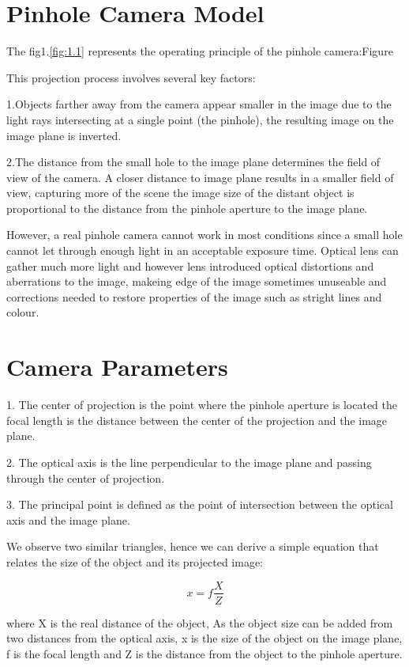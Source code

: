 \documentclass{article}
\begin{document}
\section{Pinhole Camera Model}
The fig1.\ref{fig:1.1} represents the operating principle of the pinhole camera:Figure

This projection process involves several key factors:

1.Objects farther away from the camera appear smaller in the image due to the light rays intersecting at a single point (the pinhole), the resulting image on the image plane is inverted.

2.The distance from the small hole to the image plane determines the field of view of the camera. A closer distance to image plane results in a smaller field of view, capturing more of the scene the image size of the distant object is proportional to the distance from the pinhole aperture to the image plane.

However, a real pinhole camera cannot work in most conditions since a small hole cannot let through enough light in an acceptable exposure time. Optical lens can gather much more light and however lens introduced optical distortions and aberrations to the image, makeing edge of the image sometimes unuseable and corrections needed to restore properties of the image such as stright lines and colour.

\section{Camera Parameters}
1. The center of projection is the point where the pinhole aperture is located the focal length is the distance between the center of the projection and the image plane.

2. The optical axis is the line perpendicular to the image plane and passing through the center of projection.

3. The principal point is defined as the point of intersection between the optical axis and the image plane.

We observe two similar triangles, hence we can derive a simple equation that relates the size of the object and its projected image:

\begin{equation}
    x = f \frac{X}{Z}
\end{equation}

where X is the real distance of the object, As the object size can be added from two distances from the optical axis,  x is the size of the object on the image plane,  f is the focal length and Z is the distance from the object to the pinhole aperture.
\end{document}
